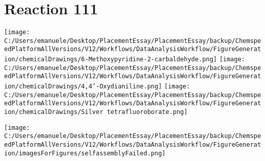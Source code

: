 \documentclass{article}%
\begin{document}
\section*{Reaction 111}%
%
\begin{scheme}[H]%
\begin{minipage}{0.5\textwidth}%
\texttt{[image: C:/Users/emanuele/Desktop/PlacementEssay/PlacementEssay/backup/ChemspeedPlatformAllVersions/V12/Workflows/DataAnalysisWorkflow/FigureGeneration/chemicalDrawings/6-Methoxypyridine-2-carbaldehyde.png]}%
\texttt{[image: C:/Users/emanuele/Desktop/PlacementEssay/PlacementEssay/backup/ChemspeedPlatformAllVersions/V12/Workflows/DataAnalysisWorkflow/FigureGeneration/chemicalDrawings/4,4'-Oxydianiline.png]}%
\texttt{[image: C:/Users/emanuele/Desktop/PlacementEssay/PlacementEssay/backup/ChemspeedPlatformAllVersions/V12/Workflows/DataAnalysisWorkflow/FigureGeneration/chemicalDrawings/Silver tetrafluoroborate.png]}%
\end{minipage}%
\begin{minipage}{0.5\textwidth}%
\begin{center}%
\texttt{[image: C:/Users/emanuele/Desktop/PlacementEssay/PlacementEssay/backup/ChemspeedPlatformAllVersions/V12/Workflows/DataAnalysisWorkflow/FigureGeneration/imagesForFigures/selfassemblyFailed.png]}%
\end{center}%
\end{minipage}%
\caption{Self-assembly of components 6, 15, with Silver(I) in a 3.0:1.5:1.0 molar ratio in CH$_3$CN at 60\textdegree C for 40h. These are the reagents (starting materials) for reaction 111.}%
\end{scheme}%
\end{document}
